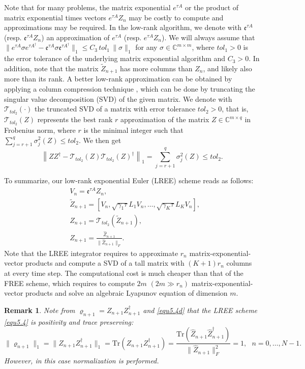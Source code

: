 \documentclass[preprint,3p,compress,12pt]{elsarticle}
\numberwithin{equation}{section}
\newtheorem{rem}[theorem]{Remark}
\numberwithin{figure}{section}
\begin{document}
Note that for many problems, the matrix exponential $e^{\tau A}$ or the product of matrix exponential times vectors $e^{\tau A}Z_n$  may be costly to compute and approximations may be
required. In the low-rank algorithm, we denote with $\mathfrak{e}^{\tau A}$ (resp. $\mathfrak{e}^{\tau A}Z_n$) an approximation of $e^{\tau A}$ (resp. $e^{\tau A}Z_n$). We will always assume that $\|e^{\tau A}\sigma e^{\tau A^{\dag}}-\mathfrak{e}^{\tau A}\sigma \mathfrak{e}^{\tau A^{\dag}}\|_1\leq C_3\, tol_1 \, \|\sigma\|_1$ for any $\sigma\in \mathbb{C}^{m\times m}$, where $tol_1>0$ is the error tolerance of the underlying matrix exponential algorithm and $C_3>0$.
In addition, note that the matrix $\tilde{Z}_{n+1}$ has more columns than $Z_n$, and likely also more than its rank. A better low-rank approximation can be obtained by applying a column compression technique \cite{Lang}, which can be done by truncating the singular value decomposition (SVD) of the given matrix. We denote with $\mathcal{T}_{tol_2}(\cdot)$ the truncated SVD of a matrix with error tolerance $tol_2>0$, that is, $\mathcal{T}_{tol_2}(Z)$ represents the best rank $r$ approximation of the matrix $Z\in \mathbb{C}^{m\times q}$ in Frobenius norm, where $r$ is the minimal integer such that $\sum_{j=r+1}^q\sigma^2_{j}(Z)\leq tol_2$. We then get
\begin{equation*}
  \left\|ZZ^{\dag}-\mathcal{T}_{tol_2}(Z)\mathcal{T}_{tol_2}(Z)^{\dag}\right\|_1=
  \sum_{j=r+1}^q\sigma^2_{j}(Z)\leq tol_2.
\end{equation*}


To summarize, our low-rank exponential Euler (LREE) scheme reads as follows:
\begin{subequations}\label{equ5.4}
  \begin{align}
  &V_n=\mathfrak{e}^{\tau A}Z_n,\label{equ5.4a}\\
  &\tilde{Z}_{n+1}=\left[V_n,\sqrt{\gamma_1\tau}L_1V_n,\ldots,\sqrt{\gamma_K\tau}L_KV_n\right],\label{equ5.4b}\\
  &\hat{Z}_{n+1}= \mathcal{T}_{tol_2}(\tilde{Z}_{n+1}),\label{equ5.4c}\\
  & Z_{n+1} = \frac{\hat{Z}_{n+1}}{\|\hat{Z}_{n+1}\|_F}.\label{equ5.4d}
\end{align}
\end{subequations}
Note that the LREE integrator requires to approximate $r_n$ matrix-exponential-vector products and
 compute a SVD of a tall matrix with $(K+1)r_n$ columns at every time step. The computational cost is much cheaper
than that of the FREE scheme, which requires to compute $2m$ $(2m\gg r_n)$ matrix-exponential-vector products and solve an algebraic Lyapunov equation of dimension $m$.
\begin{rem}
Note from $\varrho_{n+1}=Z_{n+1}Z_{n+1}^{\dag}$ and \eqref{equ5.4d} that the LREE scheme \eqref{equ5.4} is positivity and trace preserving:
\begin{equation}\label{equ5.5}
  \|\varrho_{n+1}\|_1=\|Z_{n+1}Z_{n+1}^{\dag}\|_1=\mbox{Tr}(Z_{n+1}Z_{n+1}^{\dag})=
  \frac{\mbox{Tr}(\hat{Z}_{n+1}\hat{Z}_{n+1}^{\dag})}{\|\hat{Z}_{n+1}\|_F^2}=1,~~~n=0,\ldots,N-1.
\end{equation}
However, in this case normalization is performed.
\end{rem}
\end{document}
